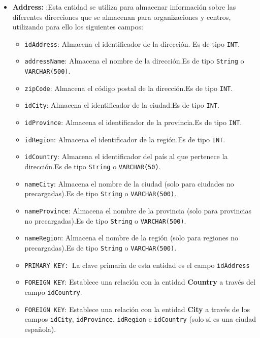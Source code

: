\begin{itemize}
    \item \textbf{Address: }:Esta entidad se utiliza para almacenar información sobre las diferentes direcciones que se almacenan para organizaciones y centros, utilizando para ello los siguientes campos:
        \begin{itemize}
        \item \texttt{idAddress}: Almacena el identificador de la dirección. Es de tipo \texttt{INT}.
        \item \texttt{addressName}: Almacena el nombre de la dirección.Es de tipo \texttt{String} o \texttt{VARCHAR(500)}.
        \item \texttt{zipCode}: Almacena el código postal de la dirección.Es de tipo \texttt{INT}.
        \item \texttt{idCity}: Almacena el identificador de la ciudad.Es de tipo \texttt{INT}.
        \item \texttt{idProvince}: Almacena el identificador de la provincia.Es de tipo \texttt{INT}.
        \item \texttt{idRegion}: Almacena el identificador de la región.Es de tipo \texttt{INT}.
        \item \texttt{idCountry}: Almacena el identificador del país al que pertenece la dirección.Es de tipo \texttt{String} o \texttt{VARCHAR(50)}.
        \item \texttt{nameCity}: Almacena el nombre de la ciudad (solo para ciudades no precargadas).Es de tipo \texttt{String} o \texttt{VARCHAR(500)}.
        \item \texttt{nameProvince}: Almacena el nombre de la provincia (solo para provincias no precargadas).Es de tipo \texttt{String} o \texttt{VARCHAR(500)}.
        \item \texttt{nameRegion}: Almacena el nombre de la región (solo para regiones no precargadas).Es de tipo \texttt{String} o \texttt{VARCHAR(500)}.
        \item \texttt{PRIMARY KEY: }La clave primaria de esta entidad es el campo \texttt{idAddress}
        \item \texttt{FOREIGN KEY}: Establece una relación con la entidad \textbf{Country} a través del campo \texttt{idCountry}.
        \item \texttt{FOREIGN KEY}: Establece una relación con la entidad \textbf{City} a través de los campos \texttt{idCity}, \texttt{idProvince}, \texttt{idRegion} e \texttt{idCountry} (solo si es una ciudad española).
        \end{itemize}


\end{itemize}
